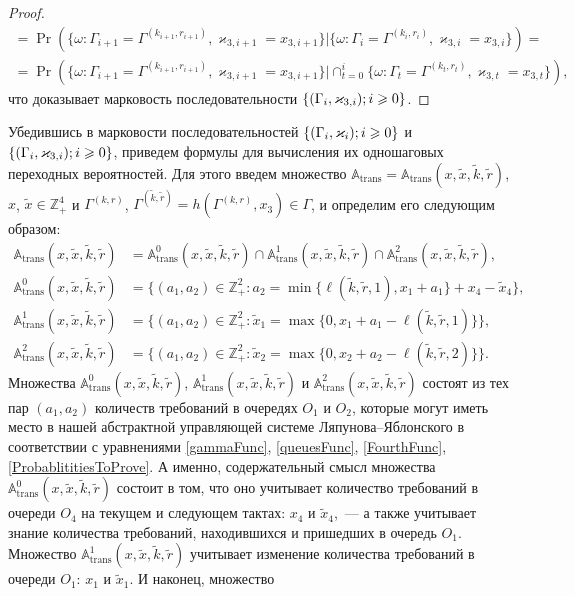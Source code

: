 \begin{proof}
\begin{multline*}
=\Pr (\{\omega\colon   \Gamma_{i+1} =\Gamma^{(k_{i+1},  r_{i+1})},  \varkappa_{3,  i+1} = x_{3,  i+1}\} |\{\omega\colon  \Gamma_i=\Gamma^{(k_i,  r_i)},   \varkappa_{3,  i}=x_{3,  i}\}) = \\
=\Pr (\{\omega\colon \Gamma_{i+1} =\Gamma^{(k_{i+1},  r_{i+1})},  \varkappa_{3,  i+1} = x_{3,  i+1}\} |\cap_{t=0}^{i}\{ \omega\colon \Gamma_t=\Gamma^{(k_t,  r_t)},   \varkappa_{3,  t}=x_{3,  t}\}),  
\end{multline*}
что доказывает марковость последовательности $\MarkThree$.
\end{proof}

Убедившись в марковости последовательностей $\Mark$ и $\MarkThree$,   приведем формулы для вычисления их одношаговых переходных вероятностей. Для этого введем множество ${\mathbb A}_{\mathrm{trans}} = {\mathbb A}_{\mathrm{trans}}(x,  \tilde{x},  \tilde{k},  \tilde{r})$,   $x$,   $\tilde{x}\in \mathbb{Z}_+^4$ и $\Gamma^{(k,  r)}$,   $\Gamma^{(\tilde{k},  \tilde{r})}=h(\Gamma^{(k,  r)},  x_3) \in \Gamma$,    и определим его следующим образом:
\begin{align}
{\mathbb A}_{\mathrm{trans}}(x,  \tilde{x},  \tilde{k},  \tilde{r}) &= {\mathbb A}_{\mathrm{trans}}^0(x,  \tilde{x},  \tilde{k},  \tilde{r}) \cap {\mathbb A}_{\mathrm{trans}}^1(x,  \tilde{x},  \tilde{k},  \tilde{r})\cap {\mathbb A}_{\mathrm{trans}}^2(x,  \tilde{x},  \tilde{k},  \tilde{r}),  \label{A:trans:1}\\
{\mathbb A}_{\mathrm{trans}}^0(x,  \tilde{x},  \tilde{k},  \tilde{r}) &= \{(a_1,  a_2) \in \mathbb{Z}_+^2 \colon a_2 = \min{\{\ell(\tilde{k},  \tilde{r},  1),   x_1+a_1}\} +x_4-\tilde{x}_4\},  \\
{\mathbb A}_{\mathrm{trans}}^1(x,  \tilde{x},  \tilde{k},  \tilde{r}) &= \{(a_1,  a_2) \in \mathbb{Z}_+^2 \colon \tilde{x}_1=\max{\{0,  x_1+a_1-\ell(\tilde{k},  \tilde{r},  1)\}}\},  \\
{\mathbb A}_{\mathrm{trans}}^2(x,  \tilde{x},  \tilde{k},  \tilde{r}) &= \{(a_1,  a_2) \in \mathbb{Z}_+^2 \colon  \tilde{x}_2=\max{\{0,  x_2+a_2-\ell(\tilde{k},  \tilde{r},  2)\}}\}.\label{A:trans:2}
\end{align}
Множества ${\mathbb A}_{\mathrm{trans}}^0(x,  \tilde{x},  \tilde{k},  \tilde{r})$,   ${\mathbb A}_{\mathrm{trans}}^1(x,  \tilde{x},  \tilde{k},  \tilde{r})$ и ${\mathbb A}_{\mathrm{trans}}^2(x,  \tilde{x},  \tilde{k},  \tilde{r})$ состоят из тех пар $(a_1,  a_2)$ количеств требований в очередях $O_1$ и $O_2$,   которые могут иметь место в нашей абстрактной управляющей системе Ляпунова--Яблонского в соответствии с уравнениями \eqref{gammaFunc},   \eqref{queuesFunc},   \eqref{FourthFunc},   \eqref{ProbablititiesToProve}. А именно,   содержательный смысл множества  ${\mathbb A}_{\mathrm{trans}}^0(x,  \tilde{x},  \tilde{k},  \tilde{r})$ состоит в том,   что оно учитывает количество требований в очереди $O_4$ на текущем и следующем тактах: $x_4$ и $\tilde{x}_4$,~--- а также учитывает знание количества требований,  находившихся и пришедших в очередь $O_1$. Множество ${\mathbb A}_{\mathrm{trans}}^1(x,  \tilde{x},  \tilde{k},  \tilde{r})$ учитывает изменение количества требований в очереди $O_1$: $x_1$ и $\tilde{x}_1$. И наконец,   множество 
